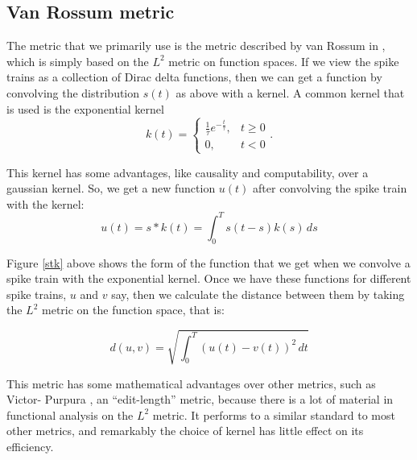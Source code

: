 \subsection{Van Rossum metric}

The metric that we primarily use is the metric described by van Rossum in 
\cite{VanRossum2001a}, which is simply based on the $L^2$ metric on function 
spaces.  If we view the spike trains as a collection of Dirac delta functions, 
then we can get a function by convolving the distribution $s(t)$ as above with 
a kernel.  A common kernel that is used is the exponential kernel 
\begin{equation}
k(t) = \left\{ \begin{array}{ll}\frac{1}{\tau}e^{-\frac{t}{\tau}}, & t\geq 0 \\
0, & t<0\end{array} \right. .
\end{equation}

This kernel has some advantages, like causality and computability, over a 
gaussian kernel.  So, we get a new function $u(t)$ after convolving the spike 
train with the kernel:
\begin{equation}
u(t) = s*k(t) = \int_0^T s(t-s)k(s)\,ds
\end{equation}




Figure \ref{stk} above shows the form of the function that we get when we 
convolve a spike train with the exponential kernel.  Once we have these 
functions for different spike trains, $u$ and $v$ say, then we calculate the 
distance between them by taking the $L^2$ metric on the function space, that is:

\begin{equation}
d(u,v) = \sqrt{\int_0^T (u(t) - v(t))^2\,dt}
\end{equation}



This metric has some mathematical advantages over other metrics, such as Victor-
Purpura \cite{VictorPurpura1997a}, an ``edit-length'' metric, because there is 
a lot of material in functional analysis on the $L^2$ metric.  It performs to a 
similar standard to most other metrics, and remarkably the choice of kernel has 
little effect on its efficiency.


